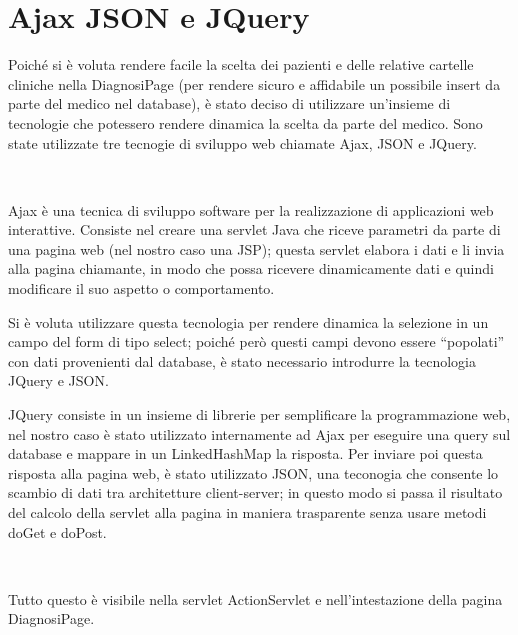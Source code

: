 \documentclass[a4paper,titlepage]{article}
\begin{document}
\section{Ajax JSON e JQuery}

Poiché si è voluta rendere facile la scelta dei pazienti e delle relative cartelle cliniche nella DiagnosiPage (per rendere sicuro e affidabile un possibile insert da parte del medico nel database), è stato deciso di utilizzare un'insieme di tecnologie che potessero rendere dinamica la scelta da parte del medico. Sono state utilizzate tre tecnogie di sviluppo web chiamate Ajax, JSON e JQuery.

~

Ajax è una tecnica di sviluppo software per la realizzazione di applicazioni web interattive. Consiste nel creare una servlet Java che riceve parametri da parte di una pagina web (nel nostro caso una JSP); questa servlet elabora i dati e li invia alla pagina chiamante, in modo che possa ricevere dinamicamente dati e quindi modificare il suo aspetto o comportamento.

Si è voluta utilizzare questa tecnologia per rendere dinamica la selezione in un campo del form di tipo select; poiché però questi campi devono essere ``popolati'' con dati provenienti dal database, è stato necessario introdurre la tecnologia JQuery e JSON.

JQuery consiste in un insieme di librerie per semplificare la programmazione web, nel nostro caso è stato utilizzato internamente ad Ajax per eseguire una query sul database e mappare in un LinkedHashMap la risposta. Per inviare poi questa risposta alla pagina web, è stato utilizzato JSON, una teconogia che consente lo scambio di dati tra architetture client-server; in questo modo si passa il risultato del calcolo della servlet alla pagina in maniera trasparente senza usare metodi doGet e doPost.

~

Tutto questo è visibile nella servlet ActionServlet e nell'intestazione della pagina DiagnosiPage.
\end{document}
